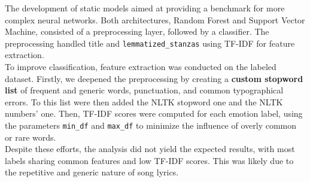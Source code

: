 

The development of static models aimed at providing a benchmark for
more complex neural networks.
Both architectures, Random Forest and Support Vector Machine, consisted of a preprocessing layer, followed by a classifier.
The preprocessing handled title and \texttt{lemmatized\_stanzas} using TF-IDF for feature
extraction.\\

To improve classification, feature extraction was conducted on the labeled dataset. 
Firstly, we deepened the preprocessing by creating a \textbf{custom stopword list} of frequent and generic words, punctuation, and common typographical errors. To this list were then added the NLTK stopword one and the NLTK numbers' one.
Then, TF-IDF scores were computed for each emotion label, using the parameters \texttt{min\_df} and \texttt{max\_df} to minimize the influence of overly common or rare words. \\
Despite these efforts, the analysis did not yield the expected results, with most labels sharing common features and low TF-IDF scores.
This was likely due to the repetitive and generic nature of song lyrics.\\

